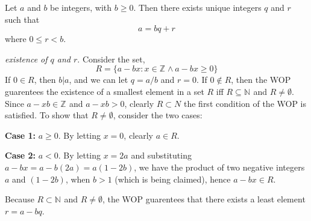 \documentclass[11pt]{article} %
\newcommand\Z[1]{\text{$\mathbb{Z}^{#1}$}}
\newcommand\N[1]{\text{$\mathbb{N}^{#1}$}}
\newcommand\set[1]{\{#1\}}
\begin{document}
{
Let $a$ and $b$ be integers, with $b \ge 0$. Then there exists unique integers $q$ and $r$ such that
$$
a = bq + r
$$
where $0 \le r < b$. 
}
{\textit{existence of $q$ and $r$}. Consider the set,
$$
R = \set{a - bx : x \in \Z{} \wedge a - bx \ge 0}
$$
If $0 \in R$, then $b | a$, and we can let $q = a/b$ and $r = 0$. If $0 \not \in R$, then the WOP guarentees the existence of a smallest element in a set $R$ iff $R \subseteq \N{}$ and $R \ne \emptyset$. Since $a-xb \in \Z{}$ and $a-xb > 0$, clearly $R \subset N$ the first condition of the WOP is satisfied. To show that $R \ne \emptyset$, consider the two cases:

\textbf{Case 1:} $a \ge 0$. By letting $x = 0$, clearly $a \in R$.

\textbf{Case 2:} $a < 0$. By letting $x = 2a$ and substituting $a-bx = a - b(2a) = a(1-2b)$, we have the product of two negative integers $a$ and $(1-2b)$, when $b > 1$ (which is being claimed), hence $a - bx \in R$.

\vspace{5 pt}
\noindent
Because $R \subset \N{}$ and $R \ne \emptyset$, the WOP guarentees that there exists a least element $r = a - bq$.
}
\end{document}
